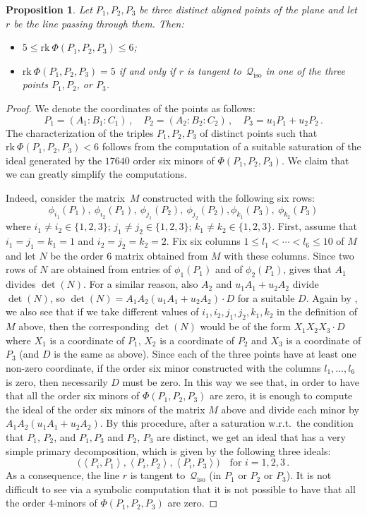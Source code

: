 \documentclass{amsart}
\theoremstyle{plain}
\newtheorem{prop}[lemma]{Proposition}
\theoremstyle{definition}
\newcommand{\iso}{\mathcal{Q}_{\mathrm{iso}}}
\newcommand{\scl}[2]{\left\langle {#1}, {#2} \right\rangle}
\newcommand{\rk}{\ensuremath{\mathrm{rk}}}
\begin{document}
\begin{prop}
\label{proposition:three_aligned_ranks}
Let $P_1, P_2, P_3$ be three distinct aligned points of the plane and let
$r$ be the line passing through them. Then:
\begin{itemize}
\item $5 \leq \rk \ \Phi(P_1, P_2, P_3) \leq 6$;
\item
$\rk \ \Phi(P_1, P_2, P_3) = 5$ if and only if $r$ is tangent
to~$\iso$ in one of the three points $P_1, P_2$, or $P_3$.
\end{itemize}
\end{prop}
\begin{proof} We denote the coordinates of the points as follows:
%
\[
P_1 = (A_1: B_1: C_1) \,, \quad P_2 = (A_2: B_2: C_2) \,, \quad P_3 = u_1P_1+u_2P_2 \,.
\]
%
The characterization of the triples $P_1, P_2, P_3$ of distinct points such that $\rk \ \Phi(P_1, P_2, P_3) < 6$ follows from the computation of a suitable saturation of the ideal generated by the $17640$ order six minors of $\Phi(P_1, P_2, P_3)$.
We claim that we can greatly simplify the computations.

Indeed, consider the matrix~$M$ constructed with the following six rows:
\[
\phi_{i_1}(P_1), \ \phi_{i_2}(P_1), \ \phi_{j_1}(P_2),\  \phi_{j_2}(P_2),
\phi_{k_1}(P_3), \ \phi_{k_2}(P_3)
\]
where $i_1 \not= i_2 \in \{1, 2, 3\}$; $j_1 \not= j_2 \in \{1, 2, 3\}$;
$k_1 \not= k_2 \in \{1, 2, 3\}$.
First, assume that $i_1=j_1=k_1=1$ and
$i_2=j_2=k_2=2$. Fix six columns
$1\leq l_1 < \cdots < l_6 \leq 10$ of $M$ and let $N$ be the order $6$ matrix
obtained from $M$ with these columns. Since two rows of $N$ are obtained from
entries of $\phi_1(P_1)$ and of $\phi_2(P_1)$,
 gives that $A_1$ divides $\det(N)$. For a similar
reason, also $A_2$ and $u_1A_1+u_2A_2$ divide $\det(N)$, so
$\det(N) = A_1A_2(u_1A_1+u_2A_2)\cdot D$ for a suitable $D$.
Again by , we also see that if we take different values of
$i_1, i_2, j_1, j_2, k_1, k_2$ in the definition of $M$ above, then
the corresponding $\det(N)$ would be of the form $X_1X_2X_3\cdot D$ where
$X_1$ is a coordinate of $P_1$, $X_2$ is a coordinate of $P_2$ and $X_3$ is
a coordinate of $P_3$ (and $D$ is the same as above). Since each of the three
points have at least one non-zero coordinate, if the order six minor
constructed with the columns $l_1, \dots, l_6$ is zero, then necessarily $D$
must be zero. In this way we see that, in order to have that all the order
six minors of $\Phi(P_1, P_2, P_3)$ are zero, it is enough to compute the
ideal of the order six minors of the matrix $M$ above and divide each
minor by $A_1A_2(u_1A_1+u_2A_2)$. By this procedure, after
a saturation w.r.t.\ the condition that $P_1$, $P_2$, and $P_1, P_3$ and
$P_2$, $P_3$ are distinct, we get an ideal that has
a very simple primary decomposition, which is given by the following three
ideals:
%
\[
\bigl( \scl{P_i}{P_1}, \scl{P_i}{P_2}, \scl{P_i}{P_3} \bigr) \quad
\mbox{for } i = 1, 2, 3 \,.
\]
%
As a consequence, the line $r$ is tangent to~$\iso$
(in $P_1$ or $P_2$ or $P_3$).
It is not difficult to see via a symbolic computation that it is not possible to have that all the order
$4$-minors of $\Phi(P_1, P_2, P_3)$ are zero.
\end{proof}
\end{document}
